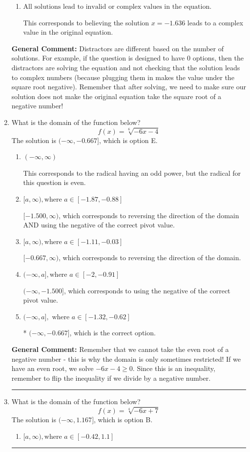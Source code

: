 \documentclass{extbook}[14pt]
\newcommand{\litem}[1]{\item #1

\rule{\textwidth}{0.4pt}}
\begin{document}
\begin{enumerate}
{\begin{enumerate}[label=\Alph*.]
$x = -3.000$ and $x = -1.636$, which corresponds to solving the equation correctly and including the value that makes the first square root 0.
\item \( \text{All solutions lead to invalid or complex values in the equation.} \)

This corresponds to believing the solution $x = -1.636$ leads to a complex value in the original equation.
\end{enumerate}

\textbf{General Comment:} Distractors are different based on the number of solutions. For example, if the question is designed to have 0 options, then the distractors are solving the equation and not checking that the solution leads to complex numbers (because plugging them in makes the value under the square root negative). Remember that after solving, we need to make sure our solution does not make the original equation take the square root of a negative number!
}
\litem{
What is the domain of the function below?
\[ f(x) = \sqrt[6]{-6 x - 4} \]The solution is \( (-\infty, -0.667] \), which is option E.\begin{enumerate}[label=\Alph*.]
\item \( (-\infty, \infty) \)

This corresponds to the radical having an odd power, but the radical for this question is even.
\item \( [a, \infty), \text{where } a \in [-1.87, -0.88] \)

$[-1.500, \infty)$, which corresponds to reversing the direction of the domain AND using the negative of the correct pivot value.
\item \( [a, \infty), \text{where } a \in [-1.11, -0.03] \)

 $[-0.667, \infty)$, which corresponds to reversing the direction of the domain.
\item \( (-\infty, a], \text{where } a \in [-2, -0.91] \)

$(-\infty, -1.500]$, which corresponds to using the negative of the correct pivot value.
\item \( (-\infty, a], \text{ where } a \in [-1.32, -0.62] \)

* $(-\infty, -0.667]$, which is the correct option.
\end{enumerate}

\textbf{General Comment:} Remember that we cannot take the even root of a negative number - this is why the domain is only sometimes restricted! If we have an even root, we solve $-6 x - 4 \geq 0$. Since this is an inequality, remember to flip the inequality if we divide by a negative number.
}
\litem{
What is the domain of the function below?
\[ f(x) = \sqrt[4]{-6 x + 7} \]The solution is \( (-\infty, 1.167] \), which is option B.\begin{enumerate}[label=\Alph*.]
\item \( [a, \infty), \text{where } a \in [-0.42, 1.1] \)


\end{enumerate}}
\end{enumerate}
\end{document}
